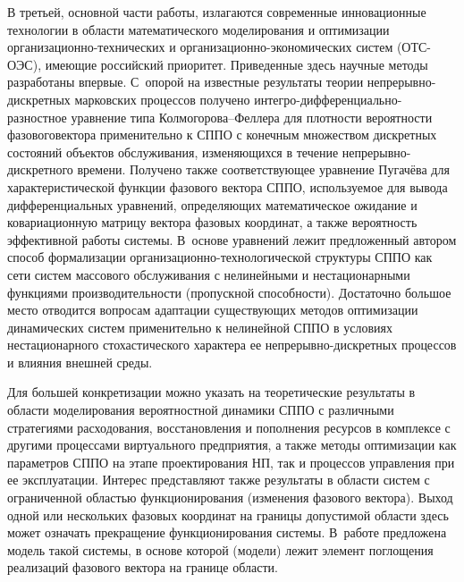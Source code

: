 \begin{multicols}{2}
{     В третьей, основной части работы, излагаются современные инновационные технологии в
области математического моделирования и оптимизации ор\-га\-ни\-за\-ци\-он\-но-тех\-ни\-че\-ских и
ор\-га\-ни\-за\-ци\-он\-но-эко\-но\-ми\-че\-ских систем (ОТС-ОЭС), имеющие российский приоритет.
Приведенные здесь научные методы разработаны впервые. С~опорой на известные результаты
теории не\-пре\-рыв\-но-дис\-крет\-ных марковских процессов получено
     ин\-тег\-ро-диф\-фе\-рен\-ци\-аль\-но-раз\-но\-ст\-ное уравнение типа Кол\-мо\-го\-ро\-ва--Фел\-ле\-ра для
плотности ве\-ро\-ят\-ности фа\-зо\-во\-го\linebreak вектора применительно к СППО с конечным множеством
дискретных состояний объектов об\-слу\-живания, изменя\-ющих\-ся в течение
     не\-пре\-рыв\-но-дис\-крет\-но\-го време\-ни.  Получено также соответствующее уравне\-ние
Пуга\-чё\-ва для характеристической функции фа\-зово\-го векто\-ра \mbox{СППО}, используемое для
вывода диф\-фе\-рен\-ци\-аль\-ных уравнений, определяющих математическое ожида\-ние и
ковариационную матрицу вектора фазовых координат, а также вероятность эффективной
работы сис\-те\-мы. В~основе уравнений лежит предложенный автором способ формализации
ор\-га\-ни\-за\-ци\-он\-но-тех\-но\-ло\-ги\-че\-ской структуры СППО как сети систем
 массового обслуживания с
нелинейными и нестационарными функциями производительности (пропускной способности).
Достаточно большое место отводится вопросам адаптации существующих методов
оптимизации динамических систем применительно к нелинейной \mbox{СППО}   в условиях
нестационарного стохастического характера ее непрерывно-дискретных процессов и влияния
внешней среды.
{

}

     Для большей конкретизации можно указать на теоретические результаты в области
моделирования вероятностной динамики СППО с различными стратегиями расходования,
восстановления и пополнения ресурсов в комплексе с другими процессами виртуального
предприятия, а также методы  оптимизации как параметров СППО на этапе проектирования
НП, так и процессов управления при ее эксплуатации. Интерес представляют также
результаты в области систем с ограниченной об\-ластью функционирования (изменения
фазового вектора). Выход одной или нескольких фазовых координат на границы допустимой
области здесь может означать прекращение функционирования системы. В~работе предложена
модель такой системы, в основе которой (модели) лежит элемент поглощения реализаций
фазового вектора на границе области.

}
\end{multicols}
